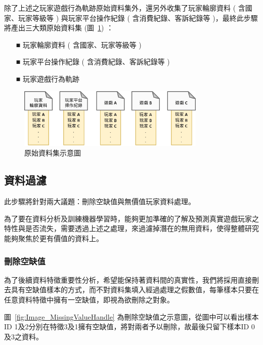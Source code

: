 除了上述之玩家遊戲行為軌跡原始資料集外，還另外收集了玩家輪廓資料 ( 含國家、玩家等級等 ) 與玩家平台操作紀錄 ( 含消費紀錄、客訴紀錄等 )，最終此步驟將產出三大類原始資料集 (圖~\ref{fig:Image_OriginalDatasets}) ：

\begin{itemize}
  \item[■] 玩家輪廓資料 ( 含國家、玩家等級等 )
  \item[■] 玩家平台操作紀錄 ( 含消費紀錄、客訴紀錄等 )
  \item[■] 玩家遊戲行為軌跡
\end{itemize} 

\begin{figure}[!htb]
  \begin{center}
    \includegraphics[width=0.8\textwidth]{figures/Image_OriginalDatasets.png}
    \caption[原始資料集示意圖]{原始資料集示意圖}
    \label{fig:Image_OriginalDatasets}
  \end{center}
\end{figure}

\subsection{資料過濾}

此步驟將針對兩大議題：刪除空缺值與無價值玩家資料處理。

為了要在資料分析及訓練機器學習時，能夠更加準確的了解及預測真實遊戲玩家之特性與是否流失，需要透過上述之處理，來過濾掉潛在的無用資料，使得整體研究能夠聚焦於更有價值的資料上。

\subsubsection{刪除空缺值}
\label{subsubsec:MissingValueHandle}

為了後續資料特徵重要性分析，希望能保持著資料間的真實性，我們將採用直接刪去具有空缺值樣本的方式，而不對資料集填入經過處理之假數值，每筆樣本只要在任意資料特徵中擁有一空缺值，即視為欲刪除之對象。

圖~\ref{fig:Image_MissingValueHandle} 為刪除空缺值之示意圖，從圖中可以看出樣本ID 1及2分別在特徵3及1擁有空缺值，將對兩者予以刪除，故最後只留下樣本ID 0及3之資料。

